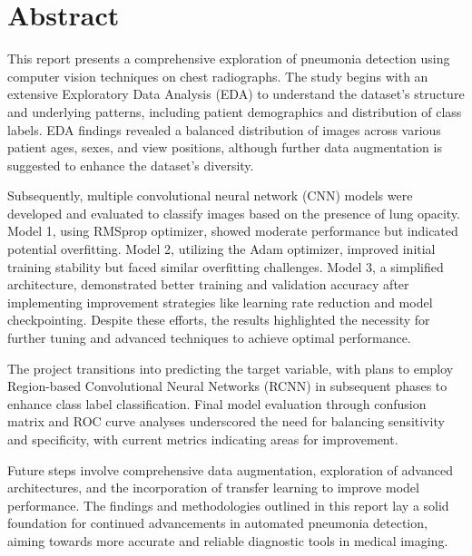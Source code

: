 \documentclass[11pt]{report}
\begin{document}
\maketitle

\chapter*{Abstract}

This report presents a comprehensive exploration of pneumonia detection using computer vision techniques on chest radiographs. The study begins with an extensive Exploratory Data Analysis (EDA) to understand the dataset's structure and underlying patterns, including patient demographics and distribution of class labels. EDA findings revealed a balanced distribution of images across various patient ages, sexes, and view positions, although further data augmentation is suggested to enhance the dataset's diversity.

Subsequently, multiple convolutional neural network (CNN) models were developed and evaluated to classify images based on the presence of lung opacity. Model 1, using RMSprop optimizer, showed moderate performance but indicated potential overfitting. Model 2, utilizing the Adam optimizer, improved initial training stability but faced similar overfitting challenges. Model 3, a simplified architecture, demonstrated better training and validation accuracy after implementing improvement strategies like learning rate reduction and model checkpointing. Despite these efforts, the results highlighted the necessity for further tuning and advanced techniques to achieve optimal performance.

The project transitions into predicting the target variable, with plans to employ Region-based Convolutional Neural Networks (RCNN) in subsequent phases to enhance class label classification. Final model evaluation through confusion matrix and ROC curve analyses underscored the need for balancing sensitivity and specificity, with current metrics indicating areas for improvement.

Future steps involve comprehensive data augmentation, exploration of advanced architectures, and the incorporation of transfer learning to improve model performance. The findings and methodologies outlined in this report lay a solid foundation for continued advancements in automated pneumonia detection, aiming towards more accurate and reliable diagnostic tools in medical imaging.
\end{document}
